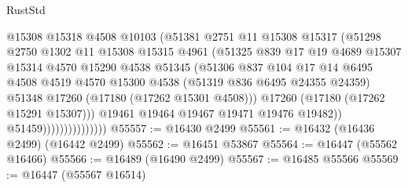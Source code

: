 \begin{lexlean}{RustStd}
\begin{coremodule}
                                  @15308
                                  @15318
                                  @4508
                                  @10103
                                  (@51381
                                    @2751
                                    @11
                                    @15308
                                    @15317
                                    (@51298
                                      @2750
                                      @1302
                                      @11
                                      @15308
                                      @15315
                                      @4961
                                      (@51325
                                        @839
                                        @17
                                        @19
                                        @4689
                                        @15307
                                        @15314
                                        @4570
                                        @15290
                                        @4538
                                        @51345
                                        (@51306
                                          @837
                                          @104
                                          @17
                                          @14
                                          @6495
                                          @4508
                                          @4519
                                          @4570
                                          @15300
                                          @4538
                                          (@51319 @836 @6495 @24355 @24359)
                                          @51348
                                          @17260
                                          (@17180 (@17262 @15301 @4508)))
                                        @17260
                                        (@17180 (@17262 @15291 @15307)))
                                      @19461
                                      @19464
                                      @19467
                                      @19471
                                      @19476
                                      @19482))
                                  @51459)))))))))))))))
@55557 := @16430 @2499
@55561 := @16432 (@16436 @2499) (@16442 @2499)
@55562 := @16451 @53867
@55564 := @16447 (@55562 @16466)
@55566 := @16489 (@16490 @2499)
@55567 := @16485 @55566
@55569 := @16447 (@55567 @16514)

\end{coremodule}
\end{lexlean}
